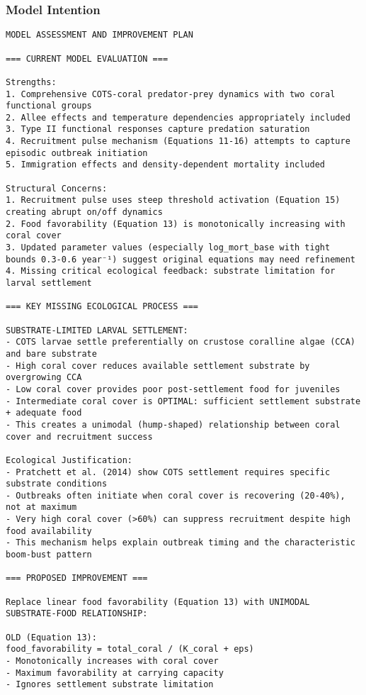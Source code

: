 \subsubsection{Model Intention}
\begin{lstlisting}
MODEL ASSESSMENT AND IMPROVEMENT PLAN

=== CURRENT MODEL EVALUATION ===

Strengths:
1. Comprehensive COTS-coral predator-prey dynamics with two coral functional groups
2. Allee effects and temperature dependencies appropriately included
3. Type II functional responses capture predation saturation
4. Recruitment pulse mechanism (Equations 11-16) attempts to capture episodic outbreak initiation
5. Immigration effects and density-dependent mortality included

Structural Concerns:
1. Recruitment pulse uses steep threshold activation (Equation 15) creating abrupt on/off dynamics
2. Food favorability (Equation 13) is monotonically increasing with coral cover
3. Updated parameter values (especially log_mort_base with tight bounds 0.3-0.6 year⁻¹) suggest original equations may need refinement
4. Missing critical ecological feedback: substrate limitation for larval settlement

=== KEY MISSING ECOLOGICAL PROCESS ===

SUBSTRATE-LIMITED LARVAL SETTLEMENT:
- COTS larvae settle preferentially on crustose coralline algae (CCA) and bare substrate
- High coral cover reduces available settlement substrate by overgrowing CCA
- Low coral cover provides poor post-settlement food for juveniles
- Intermediate coral cover is OPTIMAL: sufficient settlement substrate + adequate food
- This creates a unimodal (hump-shaped) relationship between coral cover and recruitment success

Ecological Justification:
- Pratchett et al. (2014) show COTS settlement requires specific substrate conditions
- Outbreaks often initiate when coral cover is recovering (20-40%), not at maximum
- Very high coral cover (>60%) can suppress recruitment despite high food availability
- This mechanism helps explain outbreak timing and the characteristic boom-bust pattern

=== PROPOSED IMPROVEMENT ===

Replace linear food favorability (Equation 13) with UNIMODAL SUBSTRATE-FOOD RELATIONSHIP:

OLD (Equation 13):
food_favorability = total_coral / (K_coral + eps)
- Monotonically increases with coral cover
- Maximum favorability at carrying capacity
- Ignores settlement substrate limitation


\end{lstlisting}
